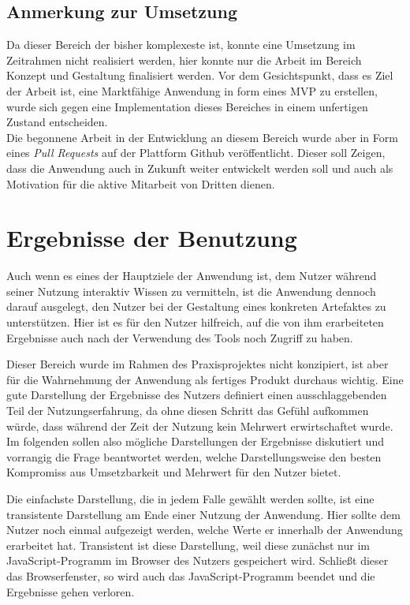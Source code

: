 \subsection{Anmerkung zur Umsetzung}
Da dieser Bereich der bisher komplexeste ist, konnte eine Umsetzung im Zeitrahmen nicht realisiert werden, hier konnte nur die Arbeit im Bereich Konzept und Gestaltung finalisiert werden.
 Vor dem Gesichtspunkt, dass es Ziel der Arbeit ist, eine Marktfähige Anwendung in form eines MVP zu erstellen, wurde sich gegen eine Implementation dieses Bereiches in einem unfertigen Zustand entscheiden.\\
Die begonnene Arbeit in der Entwicklung an diesem Bereich wurde aber in Form eines \textit{Pull Requests} auf der Plattform Github veröffentlicht. Dieser soll Zeigen, dass die Anwendung auch in Zukunft weiter entwickelt werden soll und auch als Motivation für die aktive Mitarbeit von Dritten dienen.

\section{Ergebnisse der Benutzung}
Auch wenn es eines der Hauptziele der Anwendung ist, dem Nutzer während seiner Nutzung interaktiv Wissen zu vermitteln, ist die Anwendung dennoch darauf ausgelegt, den Nutzer bei der Gestaltung eines konkreten Artefaktes zu unterstützen. Hier ist es für den Nutzer hilfreich, auf die von ihm erarbeiteten Ergebnisse auch nach der Verwendung des Tools noch Zugriff zu haben.

Dieser Bereich wurde im Rahmen des Praxisprojektes nicht konzipiert, ist aber für die Wahrnehmung der Anwendung als fertiges Produkt durchaus wichtig. Eine gute Darstellung der Ergebnisse des Nutzers definiert einen ausschlaggebenden Teil der Nutzungserfahrung, da ohne diesen Schritt das Gefühl aufkommen würde, dass während der Zeit der Nutzung kein Mehrwert erwirtschaftet wurde.
Im folgenden sollen also mögliche Darstellungen der Ergebnisse diskutiert und vorrangig die Frage beantwortet werden, welche Darstellungsweise den besten Kompromiss aus Umsetzbarkeit und Mehrwert für den Nutzer bietet.

Die einfachste Darstellung, die in jedem Falle gewählt werden sollte, ist eine transistente Darstellung am Ende einer Nutzung der Anwendung. Hier sollte dem Nutzer noch einmal aufgezeigt werden, welche Werte er innerhalb der Anwendung erarbeitet hat. Transistent ist diese Darstellung, weil diese zunächst nur im JavaScript-Programm im Browser des Nutzers gespeichert wird. Schließt dieser das Browserfenster, so wird auch das JavaScript-Programm beendet und die Ergebnisse gehen verloren.

